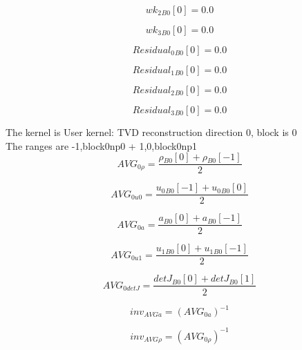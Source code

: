 \documentclass{article}
\begin{document}
\begin{dmath}{wk_{2}{_{B0}}}[{0}] = 0.0\end{dmath}

\begin{dmath}{wk_{3}{_{B0}}}[{0}] = 0.0\end{dmath}

\begin{dmath}{Residual_{0}{_{B0}}}[{0}] = 0.0\end{dmath}

\begin{dmath}{Residual_{1}{_{B0}}}[{0}] = 0.0\end{dmath}

\begin{dmath}{Residual_{2}{_{B0}}}[{0}] = 0.0\end{dmath}

\begin{dmath}{Residual_{3}{_{B0}}}[{0}] = 0.0\end{dmath}

\noindent The kernel is User kernel: TVD reconstruction direction 0, block is 0\\\noindent The ranges are -1,block0np0 + 1,0,block0np1\\\begin{dmath}AVG_{0 \rho} = \frac{{\rho{_{B0}}}[{0}] + {\rho{_{B0}}}[{-1}]}{2}\end{dmath}

\begin{dmath}AVG_{0 u0} = \frac{{u_{0}{_{B0}}}[{-1}] + {u_{0}{_{B0}}}[{0}]}{2}\end{dmath}

\begin{dmath}AVG_{0 a} = \frac{{a{_{B0}}}[{0}] + {a{_{B0}}}[{-1}]}{2}\end{dmath}

\begin{dmath}AVG_{0 u1} = \frac{{u_{1}{_{B0}}}[{0}] + {u_{1}{_{B0}}}[{-1}]}{2}\end{dmath}

\begin{dmath}AVG_{0 detJ} = \frac{{detJ{_{B0}}}[{0}] + {detJ{_{B0}}}[{1}]}{2}\end{dmath}

\begin{dmath}inv_{AVG a} = \left(AVG_{0 a} \right)^{-1}\end{dmath}

\begin{dmath}inv_{AVG \rho} = \left(AVG_{0 \rho} \right)^{-1}\end{dmath}
\end{document}
